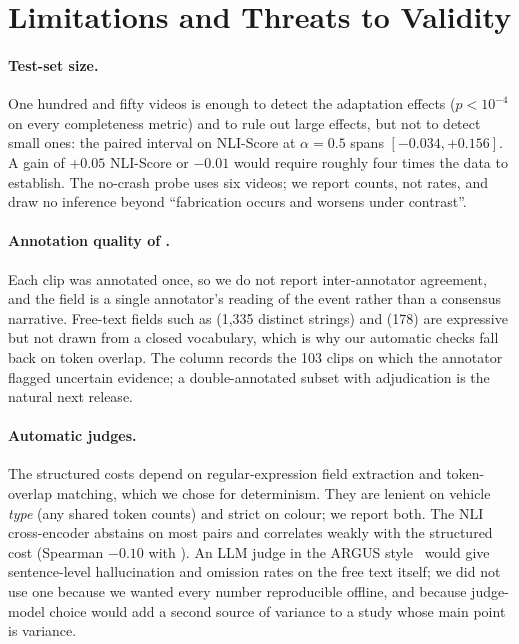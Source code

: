 \section{Limitations and Threats to Validity}
\label{sec:limitations}

\paragraph{Test-set size.}
One hundred and fifty videos is enough to detect the adaptation effects ($p<10^{-4}$ on every completeness metric) and to rule out large \tcd{} effects, but not to detect small ones: the paired interval on NLI-Score at $\alpha{=}0.5$ spans $[-0.034,+0.156]$.
A \tcd{} gain of $+0.05$ NLI-Score or $-0.01$ \Hcost{} would require roughly four times the data to establish.
The no-crash probe uses six videos; we report counts, not rates, and draw no inference beyond ``fabrication occurs and worsens under contrast''.

\paragraph{Annotation quality of \dataset{}.}
Each clip was annotated once, so we do not report inter-annotator agreement, and the  field is a single annotator's reading of the event rather than a consensus narrative.
Free-text fields such as  (1{,}335 distinct strings) and  (178) are expressive but not drawn from a closed vocabulary, which is why our automatic checks fall back on token overlap.
The  column records the 103 clips on which the annotator flagged uncertain evidence; a double-annotated subset with adjudication is the natural next release.

\paragraph{Automatic judges.}
The structured costs depend on regular-expression field extraction and token-overlap matching, which we chose for determinism.
They are lenient on vehicle \emph{type} (any shared token counts) and strict on colour; we report both.
The NLI cross-encoder abstains on most pairs and correlates weakly with the structured cost (Spearman $-0.10$ with \Hcost{}).
An LLM judge in the ARGUS style~\cite{argus2025} would give sentence-level hallucination and omission rates on the free text itself; we did not use one because we wanted every number reproducible offline, and because judge-model choice would add a second source of variance to a study whose main point is variance.

